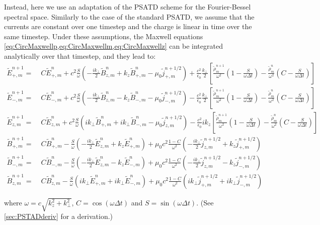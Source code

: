 \documentclass[a4paper]{article}   	%
\newcommand{\tB}[2]{\tilde{B}_{#1,m}^{#2}}
\newcommand{\tE}[2]{\tilde{E}_{#1,m}^{#2}}
\newcommand{\tj}[2]{\tilde{j}_{#1,m}^{#2}}
\newcommand{\trho}[1]{\tilde{\rho}_{m}^{#1}}
\begin{document}
Instead, here we use an adaptation of the PSATD scheme \cite{Haber} for the
Fourier-Bessel spectral space. Similarly to the case of the standard
PSATD, we assume that the currents are constant over one timestep and
the charge is linear in time over the same timestep. Under these
assumptions, the Maxwell equations \cref{eq:CircMaxwellp,eq:CircMaxwellm,eq:CircMaxwellz} can be integrated
analytically over that timestep, and they lead to:
\begin{align*}
\tE{+}{n+1} = \; & C \tE{+}{n} + 
c^2\frac{S}{\omega}\left(-\frac{ik_\perp }{2} \tB{z}{n} + k_z\tB{+}{n}
- \mu_0 \tj{+}{n+1/2} \right) + \frac{c^2}{\epsilon_0}
\frac{k_\perp}{2}\left[ \frac{\trho{n+1}}{\omega^2}\left(
  1 - \frac{S}{\omega\Delta t}\right) -
\frac{\trho{n}}{\omega^2}\left( C -\frac{S}{\omega\Delta t}\right)\right]  & \\
\tE{-}{n+1} =\; & C \tE{-}{n} +
c^2\frac{S}{\omega}\left(- \frac{ik_\perp }{2} \tB{z}{n} - k_z\tB{-}{n}
- \mu_0 \tj{-}{n+1/2} \right) - \frac{c^2}{\epsilon_0}
\frac{k_\perp}{2}\left[ \frac{\trho{n+1}}{\omega^2}\left(
  1 - \frac{S}{\omega\Delta t}\right) - \frac{\trho{n}}{\omega^2}
\left( C - \frac{S}{\omega\Delta t}\right)\right]  &\\
\tE{z}{n+1} =\; & C \tE{z}{n} + 
c^2\frac{S}{\omega}\left(ik_\perp \tB{+}{n} + ik_\perp \tB{-}{n}
- \mu_0 \tj{z}{n+1/2} \right) - \frac{c^2}{\epsilon_0}
ik_z\left[ \frac{\trho{n+1}}{\omega^2}\left(
  1 - \frac{S}{\omega\Delta t}\right) - \frac{\trho{n}}{\omega^2}
\left( C - \frac{S}{\omega\Delta t}\right)\right]  &
\end{align*}
\begin{align*}
\tB{+}{n+1} = \; & C \tB{+}{n} - 
\frac{S}{\omega}\left(-\frac{ik_\perp }{2} \tE{z}{n} + k_z\tE{+}{n}
\right) + \mu_0 c^2\frac{1-C}{\omega^2} \left( -\frac{ik_\perp }{2}
  \tj{z}{n+1/2} + k_z \tj{+}{n+1/2} \right)& \\
\tB{-}{n+1} =\; & C \tB{-}{n} - 
\frac{S}{\omega}\left(- \frac{ik_\perp }{2} \tE{z}{n} - k_z\tE{-}{n}
\right) + \mu_0 c^2\frac{1-C}{\omega^2} \left( - \frac{ik_\perp }{2}
  \tj{z}{n+1/2} - k_z \tj{-}{n+1/2} \right) &\\
\tB{z}{n+1} =\; & C \tB{z}{n} - 
\frac{S}{\omega}\left(ik_\perp \tE{+}{n} + ik_\perp \tE{-}{n}
\right) + \mu_0 c^2\frac{1-C}{\omega^2} \left( ik_\perp
  \tj{+}{n+1/2} + ik_\perp \tj{-}{n+1/2} \right)&
\end{align*}


where $\omega= c\sqrt{k_z^2 + k_\perp^2}$, $C = \cos(\omega \Delta t)$ and $S = \sin(\omega \Delta t) $. (See \cref{sec:PSTADderiv} for a derivation.)

\newpage
\appendix





\end{document}
